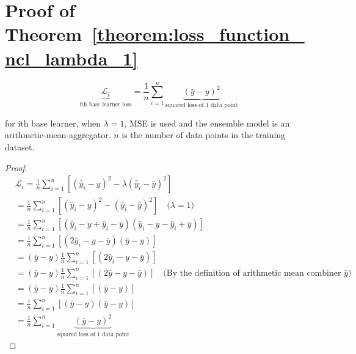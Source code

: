 \documentclass{article}
\begin{document}
\section{Proof of Theorem~\ref{theorem:loss_function_ncl_lambda_1}}
\label{appendix:loss_function_ncl_lambda_1}
\[
\underbrace{\mathcal{L}_i}_{\text{ith base learner loss}} = \frac{1}{n} \sum^{n}_{i = 1} \underbrace{(\bar{y} - y)^2}_{\text{squared loss of 1 data point}}
\]
\begin{center}
    \begin{minipage}{0.8\linewidth}
        \small
        for ith base learner, when $\lambda = 1$, MSE is used and the ensemble model is an arithmetic-mean-aggregator. $n$ is the number of data points in the training dataset. 
    \end{minipage}
    \begin{proof}
        \begin{align*}
            &\mathcal{L}_{i} = \frac{1}{n} \sum^{n}_{i = 1} \left[(\hat{y}_i - y)^2 - \lambda (\hat{y}_i - \bar{y})^2\right]
            \\
            &= \frac{1}{n} \sum^{n}_{i = 1} \left[(\hat{y}_i - y)^2 - (\hat{y}_i - \bar{y})^2\right] \quad \text{(}\lambda = 1\text{)}
            \\
            &= \frac{1}{n} \sum^{n}_{i = 1} \left[(\hat{y}_i - y + \hat{y}_i - \bar{y})(\hat{y}_i - y - \hat{y}_i + \bar{y})\right]
            \\
            &= \frac{1}{n} \sum^{n}_{i = 1} \left[(2\hat{y}_i - y - \bar{y})(\bar{y} - y)\right]
            \\
            &= (\bar{y} - y) \frac{1}{n} \sum^{n}_{i = 1} \left[(2\hat{y}_i - y - \bar{y})\right]
            \\
            &= (\bar{y} - y) \frac{1}{n} \sum^{n}_{i = 1} \left[(2\bar{y} - y - \bar{y})\right] \quad \text{(By the definition of arithmetic mean combiner }\bar{y}\text{)}
            \\
            &= (\bar{y} - y) \frac{1}{n} \sum^{n}_{i = 1} \left[(\bar{y} - y)\right]
            \\
            &= \frac{1}{n} \sum^{n}_{i = 1} \left[(\bar{y} - y)(\bar{y} - y)\right]
            \\
            &= \frac{1}{n} \sum^{n}_{i = 1} \underbrace{(\bar{y} - y)^2}_{\text{squared loss of 1 data point}}
        \end{align*}
    \end{proof}
\end{center}



\end{document}
